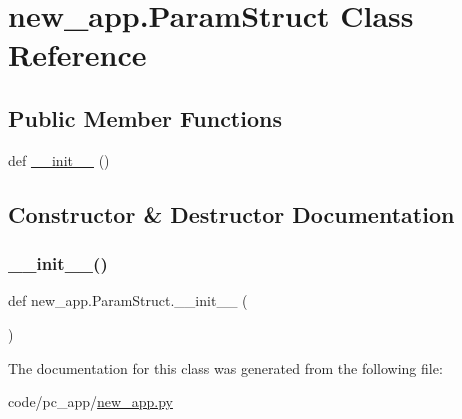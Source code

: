 \hypertarget{classnew__app_1_1ParamStruct}{}\section{new\+\_\+app.\+Param\+Struct Class Reference}
\label{classnew__app_1_1ParamStruct}
\subsection*{Public Member Functions}
\begin{DoxyCompactItemize}
\item 
def \hyperlink{classnew__app_1_1ParamStruct_aa1d6a92c83421312796c61a958fd92d0}{\+\_\+\+\_\+init\+\_\+\+\_\+} ()
\end{DoxyCompactItemize}


\subsection{Constructor \& Destructor Documentation}
\mbox{\label{classnew__app_1_1ParamStruct_aa1d6a92c83421312796c61a958fd92d0}} 
\subsubsection{\texorpdfstring{\+\_\+\+\_\+init\+\_\+\+\_\+()}{\_\_init\_\_()}}
{\footnotesize\ttfamily def new\+\_\+app.\+Param\+Struct.\+\_\+\+\_\+init\+\_\+\+\_\+ (\begin{DoxyParamCaption}{ }\end{DoxyParamCaption})}



The documentation for this class was generated from the following file\+:\begin{DoxyCompactItemize}
\item 
code/pc\+\_\+app/\hyperlink{new__app_8py}{new\+\_\+app.\+py}\end{DoxyCompactItemize}
